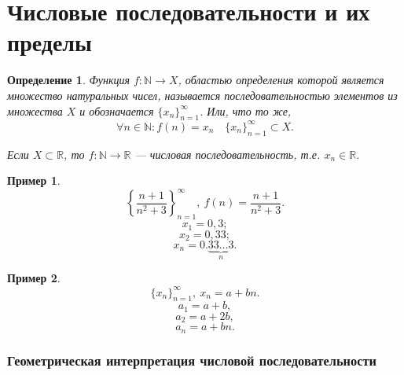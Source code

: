 \documentclass[a4paper,12pt]{article} %
\newtheorem{definition}{Определение}[section]
\theoremstyle{remark}
\theoremstyle{definition}
\newtheorem{exmp}{Пример}[section]
\begin{document}
\newpage
\section{Числовые последовательности и их пределы}

\begin{definition}
    Функция $f : \mathbb{N} \to X$, областью определения которой является множество натуральных чисел,
    называется последовательностью элементов из множества $X$ и обозначается $\{x_n\}_{n=1}^{\infty}$. Или, что то же,
    \[\forall n\in \mathbb{N}:f(n) = x_{n} \quad \{x_n\}_{n=1}^{\infty} \subset X.\] 

	Если $X \subset \mathbb{R}$, то $f:\mathbb{N}\rightarrow \mathbb{R}$ --- числовая последовательность, 
    т.е. $x_n \in \mathbb{R}$.
\end{definition}
\begin{exmp}
    \[\left\{\frac{n+1}{n^2+3}\right\}_{n=1}^{\infty}, \ f(n) = \frac{n+1}{n^2+3}.\]
    \[x_1 = 0,3;\] 
    \[x_2 = 0,33;\]
    \[x_n = 0.\underbrace{33\ldots 3}_n.\]
\end{exmp}
\begin{exmp}
    \[\{x_n\}_{n=1}^{\infty}, \ x_{n} = a + bn.\] 
    \[a_1 = a + b,\]
    \[a_2 = a + 2b,\]
    \[a_n = a + bn.\] 
\end{exmp}

\subsubsection*{Геометрическая интерпретация числовой последовательности}
\begin{center}
\end{center}
\end{document}
